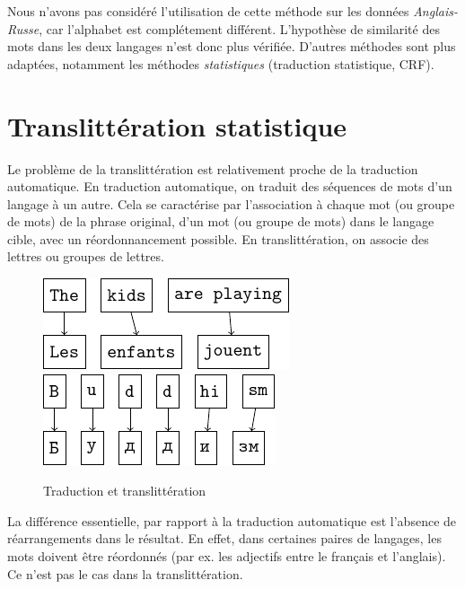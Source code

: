 \documentclass{article}
\begin{document}
Nous n'avons pas considéré l'utilisation de cette méthode sur les données \emph{Anglais-Russe}, car l'alphabet est complétement différent. L'hypothèse de similarité des mots dans les deux langages n'est donc plus vérifiée. D'autres méthodes sont plus adaptées, notamment les méthodes \emph{statistiques} (traduction statistique, CRF).

\section{Translittération statistique}
Le problème de la translittération est relativement proche de la traduction automatique. En traduction automatique, on traduit des séquences de mots d'un langage à un autre. Cela se caractérise par l'association à chaque mot (ou groupe de mots) de la phrase original, d'un mot (ou groupe de mots) dans le langage cible, avec un réordonnancement possible. En translittération, on associe des lettres ou groupes de lettres.

\begin{figure}[H]
\label{translation_alignment}
\caption{Traduction et translittération}
\centering
\vspace{0.3cm}
\includegraphics{word_alignment.pdf}
\hspace{0.5cm}
\includegraphics{letter_alignment.pdf}
\end{figure}

La différence essentielle, par rapport à la traduction automatique est l'absence de réarrangements dans le résultat. En effet, dans certaines paires de langages, les mots doivent être réordonnés (par ex. les adjectifs entre le français et l'anglais). Ce n'est pas le cas dans la translittération.
\end{document}
